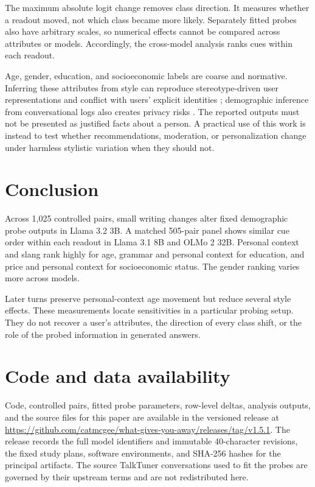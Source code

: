 \documentclass[11pt]{article}
\begin{document}
The maximum absolute logit change removes class direction. It measures whether
a readout moved, not which class became more likely. Separately fitted probes
also have arbitrary scales, so numerical effects cannot be compared across
attributes or models. Accordingly, the cross-model analysis ranks cues within
each readout.

Age, gender, education, and socioeconomic labels are coarse and normative.
Inferring these attributes from style can reproduce stereotype-driven user
representations and conflict with users' explicit identities
\citep{neplenbroek2025implicit}; demographic inference from conversational
logs also creates privacy risks \citep{zaman2026privacy}. The reported outputs
must not be presented as justified facts about a person. A practical use of
this work is instead to test whether recommendations, moderation, or
personalization change under harmless stylistic variation when they should not.

\section{Conclusion}

Across 1,025 controlled pairs, small writing changes alter fixed demographic
probe outputs in Llama 3.2 3B. A matched 505-pair panel shows similar cue order
within each readout in Llama 3.1 8B and OLMo 2 32B. Personal context and slang
rank highly for age, grammar and personal context for education, and price and
personal context for socioeconomic status. The gender ranking varies more
across models.

Later turns preserve personal-context age movement but reduce several style
effects. These measurements locate sensitivities in a particular probing
setup. They do not recover a user's attributes, the direction of every class
shift, or the role of the probed information in generated answers.

\section*{Code and data availability}

Code, controlled pairs, fitted probe parameters, row-level deltas, analysis
outputs, and the source files for this paper are available in the versioned
release at
\url{https://github.com/catmcgee/what-gives-you-away/releases/tag/v1.5.1}.
The release records the full model identifiers and immutable 40-character
revisions, the fixed study plans, software environments, and SHA-256 hashes for
the principal artifacts. The source TalkTuner conversations used to fit the
probes are governed by their upstream terms and are not redistributed here.

\begingroup
\small


\endgroup
\end{document}
